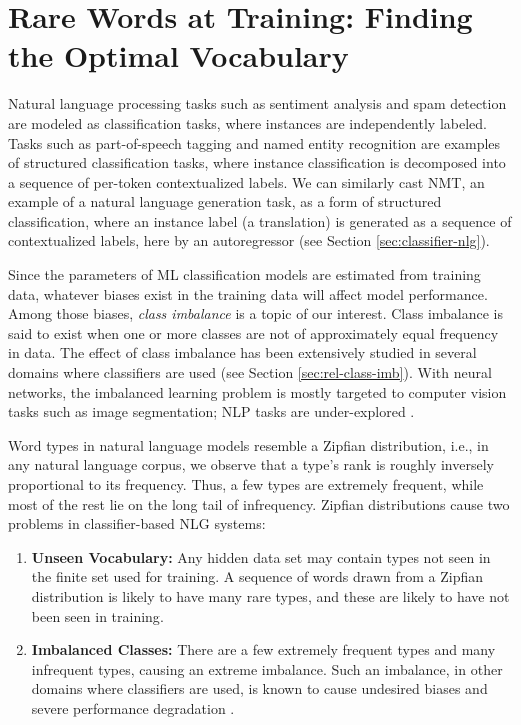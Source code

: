 \chapter{Rare Words at Training: Finding the Optimal Vocabulary}
\label{ch:nlg-imbalance}

Natural language processing tasks such as sentiment analysis \cite{maas-etal-2011-imdbreview, Zhang-etal-15-cnn-sentiment} and spam detection are modeled as classification tasks, where instances are independently labeled.
Tasks such as part-of-speech tagging and named entity recognition \cite{CoNLL-2003-NER} are examples of structured classification tasks, where instance classification is decomposed into a sequence of per-token contextualized labels.
We can similarly cast NMT, an example of a natural language generation task, as a form of structured classification, where an instance label (a translation) is generated as a sequence of contextualized labels, here by an autoregressor (see Section \ref{sec:classifier-nlg}).

Since the parameters of ML classification models are estimated from training data, whatever biases exist in the training data will affect model performance.
Among those biases, \textit{class imbalance} is a topic of our interest. 
Class imbalance is said to exist when one or more classes are not of approximately equal frequency in data.
The effect of class imbalance has been extensively studied in several domains where classifiers are used (see Section \ref{sec:rel-class-imb}).
With neural networks, the imbalanced learning problem is mostly targeted to computer vision tasks such as image segmentation; NLP tasks are under-explored \cite{Johnson2019SurveyImbalance}. 
 
Word types in natural language models resemble a Zipfian distribution, i.e., in any natural language corpus, we observe that a type's rank is roughly inversely proportional to its frequency. Thus, a few types are extremely frequent, while most of the rest lie on the long tail of infrequency. 
Zipfian distributions cause two problems in classifier-based NLG systems:
\begin{enumerate}
    \itemsep0em 
    \item \textbf{Unseen Vocabulary:} 
    Any hidden data set may contain types not seen in the finite set used for training. A sequence of words drawn from a Zipfian distribution is likely to have many rare types, and these are likely to have not been seen in training\cite{kornai2002many}. 
    \item \textbf{Imbalanced Classes:} There are a few extremely frequent types and many infrequent types, causing an extreme imbalance.  
    Such an imbalance, in other domains where classifiers are used, is known to cause undesired biases and severe performance degradation \cite{Johnson2019SurveyImbalance}. 
\end{enumerate} 

